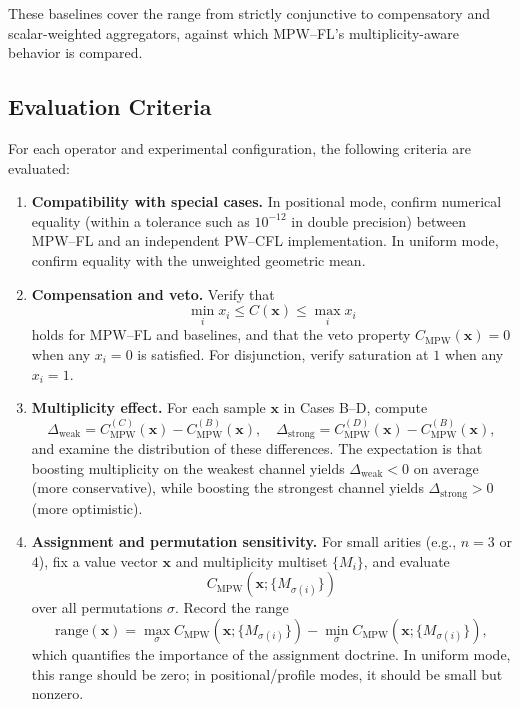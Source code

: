 \documentclass[11pt]{article}
\begin{document}
These baselines cover the range from strictly conjunctive to compensatory and scalar-weighted aggregators, against which MPW--FL’s multiplicity-aware behavior is compared.

\subsection{Evaluation Criteria}
\label{subsec:evaluation}

For each operator and experimental configuration, the following criteria are evaluated:

\begin{enumerate}[label=\textbf{E\arabic*}.]
  \item \textbf{Compatibility with special cases.} In positional mode, confirm numerical equality (within a tolerance such as $10^{-12}$ in double precision) between MPW--FL and an independent PW--CFL implementation. In uniform mode, confirm equality with the unweighted geometric mean.

  \item \textbf{Compensation and veto.} Verify that
  \[
    \min_i x_i \le C(\mathbf{x}) \le \max_i x_i
  \]
  holds for MPW--FL and baselines, and that the veto property $C_{\mathrm{MPW}}(\mathbf{x}) = 0$ when any $x_i = 0$ is satisfied. For disjunction, verify saturation at $1$ when any $x_i = 1$.

  \item \textbf{Multiplicity effect.} For each sample $\mathbf{x}$ in Cases B--D, compute
  \[
    \Delta_{\mathrm{weak}} = C_{\mathrm{MPW}}^{(C)}(\mathbf{x}) - C_{\mathrm{MPW}}^{(B)}(\mathbf{x}),\quad
    \Delta_{\mathrm{strong}} = C_{\mathrm{MPW}}^{(D)}(\mathbf{x}) - C_{\mathrm{MPW}}^{(B)}(\mathbf{x}),
  \]
  and examine the distribution of these differences. The expectation is that boosting multiplicity on the weakest channel yields $\Delta_{\mathrm{weak}} < 0$ on average (more conservative), while boosting the strongest channel yields $\Delta_{\mathrm{strong}} > 0$ (more optimistic).

  \item \textbf{Assignment and permutation sensitivity.} For small arities (e.g., $n=3$ or $4$), fix a value vector $\mathbf{x}$ and multiplicity multiset $\{M_i\}$, and evaluate
  \[
    C_{\mathrm{MPW}}(\mathbf{x};\{M_{\sigma(i)}\})
  \]
  over all permutations $\sigma$. Record the range
  \[
    \mathrm{range}(\mathbf{x}) = \max_{\sigma} C_{\mathrm{MPW}}(\mathbf{x};\{M_{\sigma(i)}\}) - \min_{\sigma} C_{\mathrm{MPW}}(\mathbf{x};\{M_{\sigma(i)}\}),
  \]
  which quantifies the importance of the assignment doctrine. In uniform mode, this range should be zero; in positional/profile modes, it should be small but nonzero.


\end{enumerate}
\end{document}
